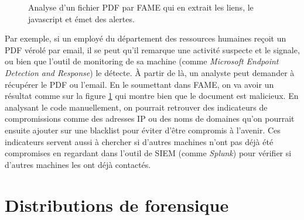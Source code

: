 \begin{figure}
    \centering
    \caption{Analyse d'un fichier PDF par FAME qui en extrait les liens, le javascript et émet des alertes.}
    \label{fig:fame-pdf-analysis}
\end{figure}

\begin{example}
    \hspace{0.45cm} Par exemple, si un employé du département des ressources humaines reçoit un PDF vérolé par email, il se peut qu'il remarque une activité suspecte et le signale, ou bien que l'outil de monitoring de sa machine (comme \textit{Microsoft Endpoint Detection and Response}) le détecte. À partir de là, un analyste peut demander à récupérer le PDF ou l'email. En le soumettant dans FAME, on va avoir un résultat comme sur la figure \ref{fig:fame-pdf-analysis} qui montre bien que le document est malicieux. En analysant le code manuellement, on pourrait retrouver des indicateurs de compromissions comme des adresses IP ou des noms de domaines qu'on pourrait ensuite ajouter sur une blacklist pour éviter d'être compromis à l'avenir. Ces indicateurs servent aussi à chercher si d'autres machines n'ont pas déjà été compromises en regardant dans l'outil de SIEM (comme \textit{Splunk}) pour vérifier si d'autres machines les ont déjà contactés.
\end{example}










\section{Distributions de forensique}

